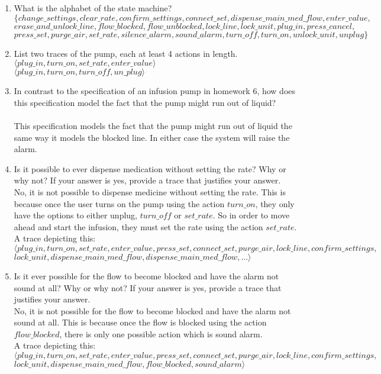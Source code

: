 \documentclass{article}
\begin{document}
\begin{enumerate}
    \item What is the alphabet of the state machine? \\
      $\{change\_settings, clear\_rate, confirm\_settings, connect\_set, dispense\_main\_med\_flow, enter\_value,$ \\
      $erase\_and\_unlock\_line, flow\_blocked, flow\_unblocked, lock\_line, lock\_unit, plug\_in, press\_cancel,$\\
      $press\_set, purge\_air, set\_rate, silence\_alarm, sound\_alarm, turn\_off, turn\_on, unlock\_unit, unplug \}$

    \item List two traces of the pump, each at least 4 actions in length. \\
$\langle plug\_in, turn\_on, set\_rate, enter\_value \rangle$ \\
$\langle plug\_in, turn\_on, turn\_off, un\_plug \rangle$
    \item In contrast to the specification of an infusion pump in homework 6, how does this specification model the fact that     the pump might run out of liquid? \\
      \\
      This specification models the fact that the pump might run out of liquid the same way it models the blocked line. In either case the system will raise the alarm.

    \item Is it possible to ever dispense medication without setting the rate?  Why or why not? If your answer is yes, provide a trace that justifies your answer. \\
No, it is not possible to dispense medicine without setting the rate. This is because once the user turns on the pump using the action $turn\_on$, they only have the options to either unplug, $turn\_off$ or $set\_rate$. So in order to move ahead and start the infusion, they must set the rate using the action $set\_rate$. \\
A trace depicting this:\\
$\langle plug\_in, turn\_on, set\_rate, enter\_value, press\_set, connect\_set, purge\_air, lock\_line, confirm\_settings,$\\ $lock\_unit, dispense\_main\_med\_flow, dispense\_main\_med\_flow, ... \rangle$
      
\item Is it ever possible for the flow to become blocked and have the alarm not sound at all?  Why or why not? If your answer is yes, provide a trace that justifies your answer. \\
No, it is not possible for the flow to become blocked and have the alarm not sound at all. This is because once the flow is blocked using the action $flow\_blocked$, there is only one possible action which is sound alarm. \\
A trace depicting this:\\
$\langle plug\_in, turn\_on, set\_rate, enter\_value, press\_set, connect\_set, purge\_air, lock\_line, confirm \_settings,$\\ $lock\_unit, dispense\_main\_med\_flow, flow\_blocked, sound\_alarm \rangle$
  

\end{enumerate}
\end{document}
